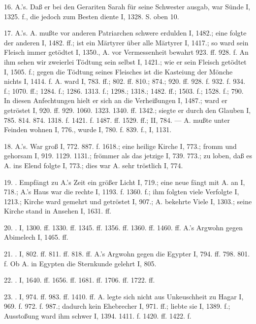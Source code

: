 16.  A.’s. Daß er bei den Gerariten Sarah für seine Schwester ausgab, war Sünde I, 1325. f., die jedoch zum Besten diente I, 1328. S. oben 10.

17.  A.’s. A. mußte vor anderen Patriarchen schwere  erdulden I, 1482.; eine folgte der anderen I, 1482. ff.; ist ein Märtyrer über alle Märtyrer I, 1417.; so ward sein Fleisch immer getödtet I, 1350., A. vor Vermessenheit bewahrt 923. ff. 928. f. An ihm sehen wir zweierlei Tödtung sein selbst I, 1421.; wie er sein Fleisch getödtet I, 1505. f.; gegen die Tödtung seines Fleisches ist die Kasteiung der Mönche nichts I, 1414. f. A. ward  I, 783. ff.; 802. ff. 810.; 874.; 920. ff. 928. f. 932. f. 934. f.; 1070. ff.; 1284. f.; 1286. 1313. f.; 1298.; 1318.; 1482. ff.; 1503. f.; 1528. f.; 790. In diesen Anfechtungen hielt er sich an die Verheißungen I, 1487.; ward er getröstet I, 920. ff. 929. 1060. 1323. 1340. ff. 1342.; siegte er durch den Glauben I, 785. 814. 874. 1318. f. 1421. f. 1487. ff. 1529. ff.; II, 784. — A. mußte unter Feinden wohnen I, 776., wurde  I, 780. f. 839. f.,  I, 1131.

18.  A.’s. War groß I, 772. 887. f. 1618.; eine heilige Kirche I, 773.; fromm und gehorsam I, 919. 1129. 1131.; frömmer als das jetzige I, 739. 773.; zu loben, daß es A. ins Elend folgte I, 773.; dies war A. sehr tröstlich I, 774.

19. . Empfängt zu A.’s Zeit ein größer Licht I, 719.; eine neue fängt mit A. an I, 718.; A.’s Haus war die rechte I, 1193. f. 1360. f.; ihm folgten viele Verfolgte I, 1213.; Kirche ward gemehrt und getröstet I, 907.; A. bekehrte Viele I, 1303.; seine Kirche stand in Ansehen I, 1631. ff.

20. . I, 1300. ff. 1330. ff. 1345. ff. 1356. ff. 1360. ff. 1460. ff. A.’s Argwohn gegen Abimelech I, 1465. ff.

21. . I, 802. ff. 811. ff. 818. ff. A.’s Argwohn gegen die Egypter I, 794. ff. 798. 801. f. Ob A. in Egypten die Sternkunde gelehrt I, 805.

22. . I, 1640. ff. 1656. ff. 1681. ff. 1706. ff. 1722. ff.

23. . I, 974. ff. 983. ff. 1410. ff. A. legte sich nicht aus Unkeuschheit zu Hagar I, 969. f. 972. f. 987.; dadurch kein Ehebrecher I, 971. ff.; liebte sie I, 1389. f.; Ausstoßung ward ihm schwer I, 1394. 1411. f. 1420. ff. 1422. f.

